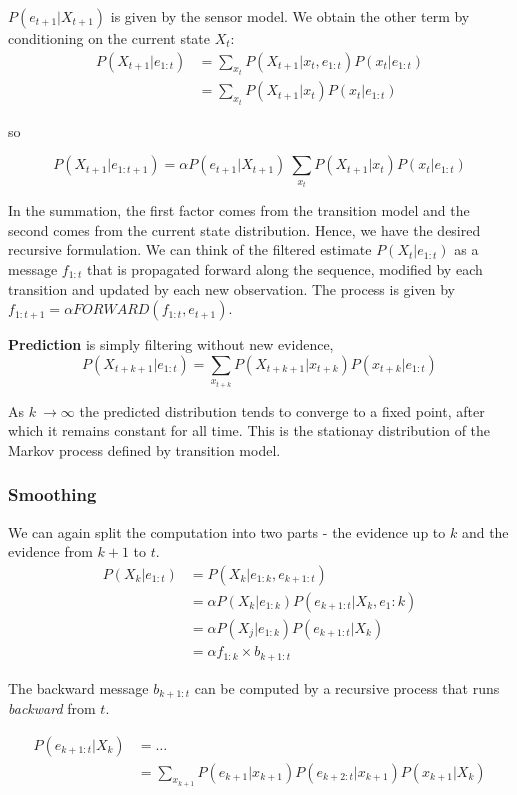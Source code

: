 \documentclass{scrartcl}
\begin{document}
\(P(e_{t+1} | X_{t+1})\) is given by the sensor model. We obtain the other term by conditioning on the current state \(X_t\):
\begin{align*}
    P(X_{t+1} | e_{1:t}) &= \sum_{x_t} P(X_{t+1} | x_t, e_{1:t}) P(x_t | e_{1:t})\\
    &= \sum_{x_t} P(X_{t+1} | x_t)P(x_t|e_{1:t})
\end{align*}

so

\[P(X_{t+1} | e_{1:t+1}) = \alpha P(e_{t+1} | X_{t+1}) \ \sum_{x_t} P(X_{t+1} | x_t)P(x_t|e_{1:t})\]




In the summation, the first factor comes from the transition model and the second comes from the current state distribution. Hence, we have the desired recursive formulation. 
We can think of the filtered estimate \(P(X_t | e_{1:t})\) as a message \(f_{1:t}\) that is propagated forward along the sequence, modified by each transition and updated by each new observation. 
The process is given by \(f_{1:t+1} = \alpha FORWARD(f_{1:t}, e_{t+1})\).

\bigbreak

\textbf{Prediction} is simply filtering without new evidence, 
\[P(X_{t+k+1} | e_{1:t}) = \sum_{x_{t+k}} P(X_{t+k+1}|x_{t+k}) P(x_{t+k}|e_{1:t})\]

As \(k\ \rightarrow \infty\) the predicted distribution tends to converge to a fixed point, after which it remains constant for all time. This is the stationay distribution of the Markov process defined by transition model.

\subsubsection{Smoothing}
We can again split the computation into two parts - the evidence up to \(k\) and the evidence from \(k+1\) to \(t\).
\begin{align*}
    P(X_k | e_{1:t}) &= P(X_k | e_{1:k}, e_{k+1:t})\\
    &= \alpha P(X_k | e_{1:k}) P(e_{k+1:t}|X_k, e_1:k)\\
    &= \alpha P(X_j | e_{1:k}) P(e_{k+1:t} | X_k)\\
    &= \alpha f_{1:k} \times b_{k+1:t}
\end{align*}

The backward message \(b_{k+1:t}\) can be computed by a recursive process that runs \textit{backward} from \(t\).

\begin{align*}
    P(e_{k+1:t} | X_k) &= \dots\\
    &= \sum_{x_{k+1}} P(e_{k+1}|x_{k+1}) P(e_{k+2:t}|x_{k+1}) P(x_{k+1}|X_k)
\end{align*}
\end{document}
